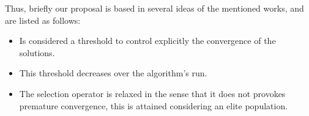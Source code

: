 Thus, briefly our proposal is based in several ideas of the mentioned works, and are listed as follows:
\begin{itemize}
\item Is considered a threshold to control explicitly the convergence of the solutions.
\item This threshold decreases over the algorithm's run.
\item The selection operator is relaxed in the sense that it does not provokes premature convergence, this is attained considering an elite population. 
\end{itemize}

